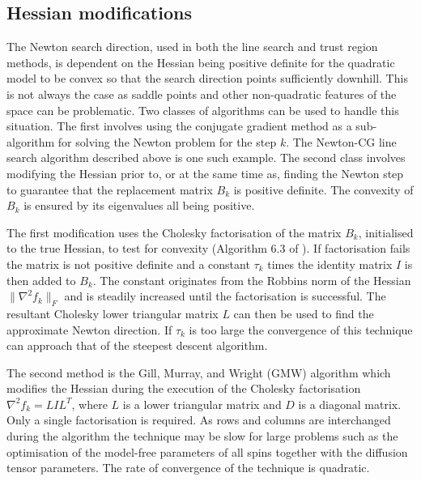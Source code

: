 
\subsection{Hessian modifications}

The Newton search direction, used in both the line search and trust region methods, is dependent on the Hessian being positive definite for the quadratic model to be convex so that the search direction points sufficiently downhill.
This is not always the case as saddle points and other non-quadratic features of the space can be problematic.
Two classes of algorithms can be used to handle this situation.
The first involves using the conjugate gradient method as a sub-algorithm for solving the Newton problem for the step $k$.
The Newton-CG line search algorithm described above is one such example.
The second class involves modifying the Hessian prior to, or at the same time as, finding the Newton step to guarantee that the replacement matrix $B_k$ is positive definite.
The convexity of $B_k$ is ensured by its eigenvalues all being positive.

The first modification uses the Cholesky factorisation of the matrix $B_k$, initialised to the true Hessian, to test for convexity (Algorithm 6.3 of \citet{NocedalWright99}).
If factorisation fails the matrix is not positive definite and a constant $\tau_k$ times the identity matrix $I$ is then added to $B_k$.
The constant originates from the Robbins norm of the Hessian $\lVert \nabla^2 f_k \rVert_F$ and is steadily increased until the factorisation is successful.
The resultant Cholesky lower triangular matrix $L$ can then be used to find the approximate Newton direction.
If $\tau_k$ is too large the convergence of this technique can approach that of the steepest descent algorithm.

The second method is the Gill, Murray, and Wright (GMW) algorithm \citep{GMW81} which modifies the Hessian during the execution of the Cholesky factorisation $\nabla^2 f_k = LIL^T$, where $L$ is a lower triangular matrix and $D$ is a diagonal matrix.
Only a single factorisation is required.
As rows and columns are interchanged during the algorithm the technique may be slow for large problems such as the optimisation of the model-free parameters of all spins together with the diffusion tensor parameters.
The rate of convergence of the technique is quadratic.



